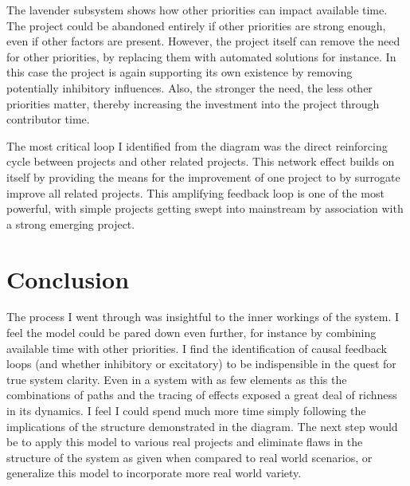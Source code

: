 \documentclass[10pt]{article}
\begin{document}
The lavender subsystem shows how other priorities can impact available time.  The project could be abandoned entirely if other priorities are strong enough, even if other factors are present.  However, the project itself can remove the need for other priorities, by replacing them with automated solutions for instance.  In this case the project is again supporting its own existence by removing potentially inhibitory influences.  Also, the stronger the need, the less other priorities matter, thereby increasing the investment into the project through contributor time.  

The most critical loop I identified from the diagram was the direct reinforcing cycle between projects and other related projects.  This network effect builds on itself by providing the means for the improvement of one project to by surrogate improve all related projects.  This amplifying feedback loop is one of the most powerful, with simple projects getting swept into mainstream by association with a strong emerging project.

\section{Conclusion}

The process I went through was insightful to the inner workings of the system.  I feel the model could be pared down even further, for instance by combining available time with other priorities.  I find the identification of causal feedback loops (and whether inhibitory or excitatory) to be indispensible in the quest for true system clarity.  Even in a system with as few elements as this the combinations of paths and the tracing of effects exposed a great deal of richness in its dynamics.  I feel I could spend much more time simply following the implications of the structure demonstrated in the diagram.  The next step would be to apply this model to various real projects and eliminate flaws in the structure of the system as given when compared to real world scenarios, or generalize this model to incorporate more real world variety.  
\end{document}
